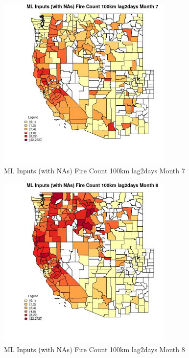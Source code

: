 \begin{figure} 
\centering  
\includegraphics[width=0.77\textwidth]{Code_Outputs/Report_ML_input_PM25_Step4_part_f_de_duplicated_aves_prioritize_24hr_obswNAs_CountyFire_Count_100km_lag2daysmedianMonth7.jpg} 
\caption{\label{fig:Report_ML_input_PM25_Step4_part_f_de_duplicated_aves_prioritize_24hr_obswNAsCountyFire_Count_100km_lag2daysmedianMonth7}ML Inputs (with NAs) Fire Count 100km lag2days Month 7} 
\end{figure} 
 

\begin{figure} 
\centering  
\includegraphics[width=0.77\textwidth]{Code_Outputs/Report_ML_input_PM25_Step4_part_f_de_duplicated_aves_prioritize_24hr_obswNAs_CountyFire_Count_100km_lag2daysmedianMonth8.jpg} 
\caption{\label{fig:Report_ML_input_PM25_Step4_part_f_de_duplicated_aves_prioritize_24hr_obswNAsCountyFire_Count_100km_lag2daysmedianMonth8}ML Inputs (with NAs) Fire Count 100km lag2days Month 8} 
\end{figure} 
 

